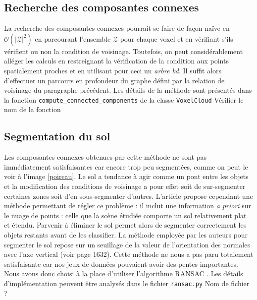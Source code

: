 \documentclass[a4paper, onecolumn, 11pt]{article}
\newcommand{\TODO}{\fbox{\textcolor{red}{TODO}}}
\begin{document}
\subsection{Recherche des composantes connexes}
La recherche des composantes connexes pourrait se faire de façon naïve en $\mathcal{O}(|\mathcal{Z}|^2)$ en parcourant l'ensemble $\mathcal{Z}$ pour chaque voxel et en vérifiant s'ils vérifient ou non la condition de voisinage. Toutefois, on peut considérablement alléger les calculs en restreignant la vérification de la condition aux points spatialement proches et en utilisant pour ceci un \emph{arbre kd}. Il suffit alors d'effectuer un parcours en profondeur du graphe défini par la relation de voisinage du paragraphe précédent. Les détails de la méthode sont présentés dans la fonction \texttt{compute\_connected\_components} de la classe \texttt{VoxelCloud} \TODO Vérifier le nom de la fonction

\subsection{Segmentation du sol}
Les composantes connexes obtenues par cette méthode ne sont pas immédiatement satisfaisantes car encore trop peu segmentées, comme on peut le voir à l'image \ref{poireau}. Le sol a tendance à agir comme un pont entre les objets et la modification des conditions de voisinage a pour effet soit de sur-segmenter certaines zones soit d'en sous-segmenter d'autres. L'article propose cependant une méthode permettant de régler ce problème : il inclut une information \emph{a priori} sur le nuage de points : celle que la scène étudiée comporte un sol relativement plat et étendu. Parvenir à éliminer le sol permet alors de segmenter correctement les objets restants avant de les classifier.
La méthode employée par les auteurs pour segmenter le sol repose sur un seuillage de la valeur de l'orientation des normales avec l'axe vertical (voir page 1632). Cette méthode ne nous a pas paru totalement satisfaisante car nos jeux de données pouvaient avoir des pentes importantes. Nous avons donc choisi à la place d'utiliser l'algorithme RANSAC \cite{ransac}. Les détails d'implémentation peuvent être analysés dans le fichier \texttt{ransac.py} \TODO Nom de fichier ?
\end{document}
